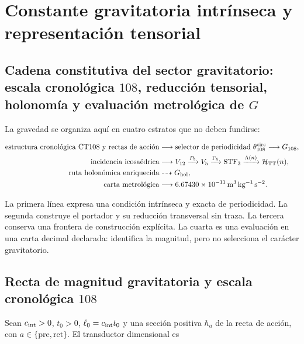 \section{Constante gravitatoria intr\'inseca y representaci\'on tensorial}
\label{rm:ch:gravity}

\subsection{Cadena constitutiva del sector gravitatorio: escala cronológica \texorpdfstring{\(108\)}{108}, reducción tensorial, holonomía y evaluación metrológica de \texorpdfstring{\(G\)}{G}}

La gravedad se organiza aqu\'i en cuatro estratos que no deben fundirse:

\begin{equation}
\label{rm:eq:gravity-causal-chain}
\begin{aligned}
\text{estructura cronol\'ogica CT108 y rectas de acci\'on}
&\longrightarrow \text{selector de periodicidad }\theta_{108}^{\rm circ}
\longrightarrow G_{108},\\
\text{incidencia icosa\'edrica}
&\longrightarrow V_{12}\xrightarrow{P_5}V_5
\xrightarrow{\Gamma_5}\operatorname{STF}_3
\xrightarrow{\Lambda(n)}\mathcal H_{\rm TT}(n),\\
\text{ruta holon\'omica enriquecida}
&\dashrightarrow G_{\rm hol},\\
\text{carta metrol\'ogica}
&\longrightarrow 6.67430\times10^{-11}\,
\mathrm{m^3\,kg^{-1}\,s^{-2}}.
\end{aligned}
\end{equation}

La primera l\'inea expresa una condici\'on intr\'inseca y exacta de
periodicidad. La segunda construye
el portador y su reducci\'on transversal sin traza. La tercera conserva una
frontera de construcci\'on expl\'icita. La cuarta es una evaluaci\'on en una
carta decimal declarada: identifica la magnitud, pero no selecciona el car\'acter
gravitatorio.

\subsection{Recta de magnitud gravitatoria y escala cronol\'ogica \texorpdfstring{\(108\)}{108}}

Sean \(c_{\rm int}>0\), \(t_0>0\),
\(\ell_0=c_{\rm int}t_0\) y una secci\'on positiva
\(\hbar_a\) de la recta de acci\'on, con
\(a\in\{\mathrm{pre},\mathrm{ret}\}\). El transductor dimensional es

